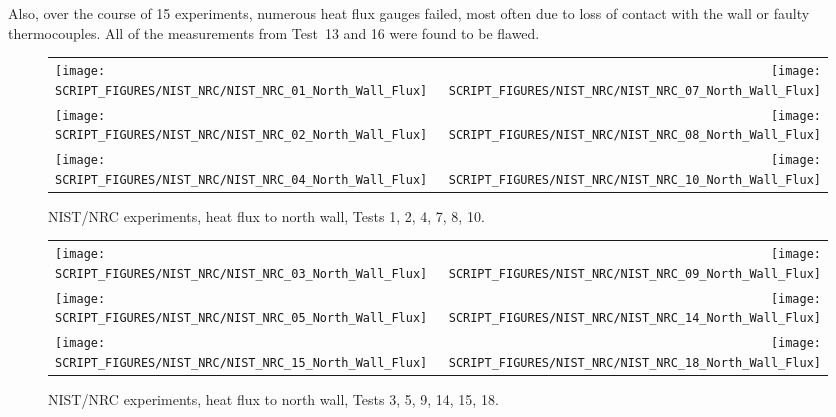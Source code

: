 Also, over the course of 15 experiments, numerous heat flux gauges failed, most often due to loss of contact with the wall or faulty thermocouples. All of the measurements from Test~13 and 16 were found to be flawed.

\newpage

\begin{figure}[p]
\begin{tabular*}{\textwidth}{l@{\extracolsep{\fill}}r}
\texttt{[image: SCRIPT\_FIGURES/NIST\_NRC/NIST\_NRC\_01\_North\_Wall\_Flux]} &
\texttt{[image: SCRIPT\_FIGURES/NIST\_NRC/NIST\_NRC\_07\_North\_Wall\_Flux]} \\
\texttt{[image: SCRIPT\_FIGURES/NIST\_NRC/NIST\_NRC\_02\_North\_Wall\_Flux]} &
\texttt{[image: SCRIPT\_FIGURES/NIST\_NRC/NIST\_NRC\_08\_North\_Wall\_Flux]} \\
\texttt{[image: SCRIPT\_FIGURES/NIST\_NRC/NIST\_NRC\_04\_North\_Wall\_Flux]} &
\texttt{[image: SCRIPT\_FIGURES/NIST\_NRC/NIST\_NRC\_10\_North\_Wall\_Flux]}
\end{tabular*}
\caption[NIST/NRC experiments, heat flux to north wall, Tests 1, 2, 4, 7, 8, 10]{NIST/NRC experiments, heat flux to north wall, Tests 1, 2, 4, 7, 8, 10.}
\label{NIST_NRC_North_Wall_Flux_Closed}
\end{figure}

\begin{figure}[p]
\begin{tabular*}{\textwidth}{l@{\extracolsep{\fill}}r}
\texttt{[image: SCRIPT\_FIGURES/NIST\_NRC/NIST\_NRC\_03\_North\_Wall\_Flux]} &
\texttt{[image: SCRIPT\_FIGURES/NIST\_NRC/NIST\_NRC\_09\_North\_Wall\_Flux]} \\
\texttt{[image: SCRIPT\_FIGURES/NIST\_NRC/NIST\_NRC\_05\_North\_Wall\_Flux]} &
\texttt{[image: SCRIPT\_FIGURES/NIST\_NRC/NIST\_NRC\_14\_North\_Wall\_Flux]} \\
\texttt{[image: SCRIPT\_FIGURES/NIST\_NRC/NIST\_NRC\_15\_North\_Wall\_Flux]} &
\texttt{[image: SCRIPT\_FIGURES/NIST\_NRC/NIST\_NRC\_18\_North\_Wall\_Flux]}
\end{tabular*}
\caption[NIST/NRC experiments, heat flux to north wall, Tests 3, 5, 9, 14, 15, 18]{NIST/NRC experiments, heat flux to north wall, Tests 3, 5, 9, 14, 15, 18.}
\label{NIST_NRC_North_Wall_Flux_Open}
\end{figure}

